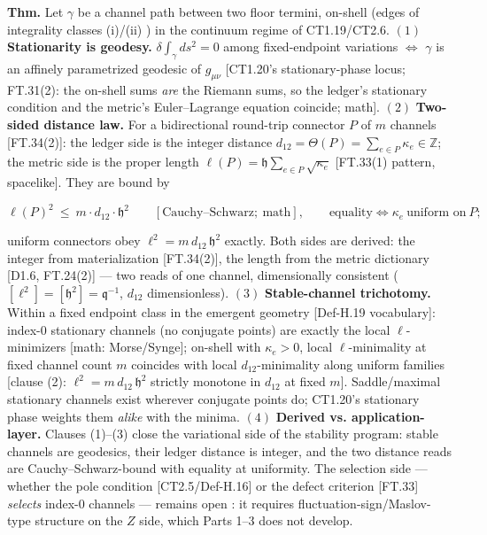 \begin{theorem}\label{tag:FT-48}
\textbf{Thm.} Let $\gamma$ be a channel path between two floor termini, on-shell (edges of integrality classes (i)/(ii) ) in the continuum regime of CT1.19/CT2.6. $(1)$ \textbf{Stationarity is geodesy.} $\delta\!\int_\gamma ds^2=0$ among fixed-endpoint variations $\iff$ $\gamma$ is an affinely parametrized geodesic of $g_{\mu\nu}$ [CT1.20's stationary-phase locus; FT.31(2): the on-shell sums \textit{are} the Riemann sums, so the ledger's stationary condition and the metric's Euler–Lagrange equation coincide; math]. $(2)$ \textbf{Two-sided distance law.} For a bidirectional round-trip connector $P$ of $m$ channels [FT.34(2)]: the ledger side is the integer distance $d_{12}=\Theta(P)=\sum_{e\in P}\kappa_e\in\mathbb Z$; the metric side is the proper length $\ell(P)=\mathfrak h\sum_{e\in P}\sqrt{\kappa_e}$ [FT.33(1) pattern, spacelike]. They are bound by

\[
\ell(P)^2\ \le\ m\cdot d_{12}\cdot\mathfrak h^2\qquad[\text{Cauchy–Schwarz};\ \text{math}],\qquad\text{equality}\iff\kappa_e\ \text{uniform on}\ P;
\]

uniform connectors obey $\ell^2=m\,d_{12}\,\mathfrak h^2$ exactly. Both sides are derived: the integer from materialization [FT.34(2)], the length from the metric dictionary [D1.6, FT.24(2)] — two reads of one channel, dimensionally consistent ($[\ell^2]=[\mathfrak h^2]=\mathfrak q^{-1}$, $d_{12}$ dimensionless). $(3)$ \textbf{Stable-channel trichotomy.} Within a fixed endpoint class in the emergent geometry [Def-H.19 vocabulary]: index-0 stationary channels (no conjugate points) are exactly the local $\ell$-minimizers [math: Morse/Synge]; on-shell with $\kappa_e>0$, local $\ell$-minimality at fixed channel count $m$ coincides with local $d_{12}$-minimality along uniform families [clause (2): $\ell^2=m\,d_{12}\,\mathfrak h^2$ strictly monotone in $d_{12}$ at fixed $m$]. Saddle/maximal stationary channels exist wherever conjugate points do; CT1.20's stationary phase weights them \textit{alike} with the minima. $(4)$ \textbf{Derived vs. application-layer.} Clauses (1)–(3) close the variational side of the stability program: stable channels are geodesics, their ledger distance is integer, and the two distance reads are Cauchy–Schwarz-bound with equality at uniformity. The selection side — whether the pole condition [CT2.5/Def-H.16] or the defect criterion [FT.33] \textit{selects} index-0 channels — remains open : it requires fluctuation-sign/Maslov-type structure on the $Z$ side, which Parts 1–3 does not develop.


\end{theorem}
